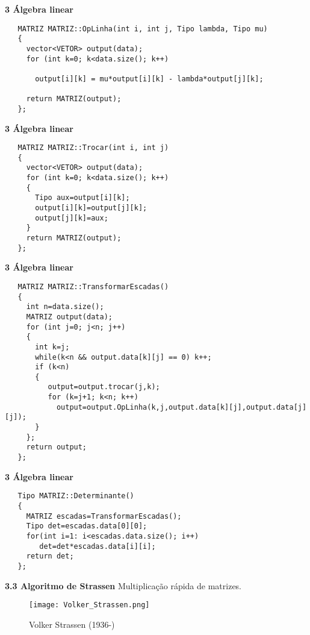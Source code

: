 \documentclass{beamer}
\begin{document}
\begin{frame}[fragile]{\bf 3  Álgebra linear }
\lstset{language=C++}
\begin{lstlisting}
   MATRIZ MATRIZ::OpLinha(int i, int j, Tipo lambda, Tipo mu)
   {
     vector<VETOR> output(data);                 
     for (int k=0; k<data.size(); k++) 
      
       output[i][k] = mu*output[i][k] - lambda*output[j][k];
     
     return MATRIZ(output);
   };
\end{lstlisting}
\end{frame}


\begin{frame}[fragile]{\bf 3  Álgebra linear }
\lstset{language=C++}
\begin{lstlisting}
   MATRIZ MATRIZ::Trocar(int i, int j)
   {
     vector<VETOR> output(data);                 
     for (int k=0; k<data.size(); k++) 
     {      
       Tipo aux=output[i][k];
       output[i][k]=output[j][k];
       output[j][k]=aux;
     }
     return MATRIZ(output);
   };
\end{lstlisting}
\end{frame}


\begin{frame}[fragile]{\bf 3  Álgebra linear }
\lstset{language=C++,basicstyle=\tiny}
\begin{lstlisting}
   MATRIZ MATRIZ::TransformarEscadas()
   {
     int n=data.size();
     MATRIZ output(data);
     for (int j=0; j<n; j++) 
     {      
       int k=j;
       while(k<n && output.data[k][j] == 0) k++;
       if (k<n) 
       {	
          output=output.trocar(j,k);
          for (k=j+1; k<n; k++)
            output=output.OpLinha(k,j,output.data[k][j],output.data[j][j]);
       }
     };
     return output;
   };
\end{lstlisting}
\end{frame}


\begin{frame}[fragile]{\bf 3  Álgebra linear }
\lstset{language=C++}
\begin{lstlisting}
   Tipo MATRIZ::Determinante()
   {
     MATRIZ escadas=TransformarEscadas();
     Tipo det=escadas.data[0][0];
     for(int i=1: i<escadas.data.size(); i++)
     	det=det*escadas.data[i][i];
     return det;
   };
\end{lstlisting}
\end{frame}

\begin{frame}{\bf 3.3 Algoritmo de Strassen}
Multiplicação rápida de matrizes.
\begin{figure}[h]
  \begin{center}
    \texttt{[image: Volker\_Strassen.png]}
  \end{center}

  \caption*{Volker Strassen (1936-)}
  \label{demTP}
\end{figure}

\end{frame}
\end{document}
